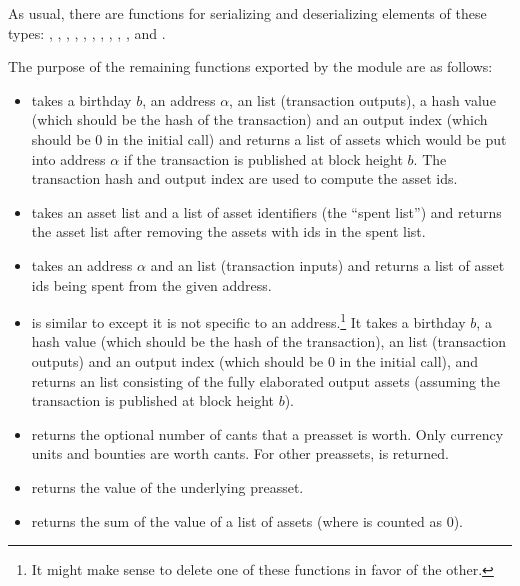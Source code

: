 As usual, there are functions for serializing and deserializing elements of these types:
{},
{},
{},
{},
{},
{},
{},
{},
{},
{},
{}
and
{}.

The purpose of the remaining functions exported by the {} module are as follows:
\begin{itemize}
\item {} takes a birthday $b$, an address $\alpha$,
an {} list (transaction outputs), a hash value (which should
be the hash of the transaction)
and an output index (which should be $0$ in the initial call)
and returns a list of assets which would be put into address $\alpha$
if the transaction is published at block height $b$.
The transaction hash and output index are used to compute the asset ids.
\item {} takes an asset list and a list of asset identifiers (the ``spent list'') and
returns the asset list after removing the assets with ids in the spent list.
\item {} takes an address $\alpha$ and an {} list (transaction inputs)
and returns a list of asset ids being spent from the given address.
\item {} is similar to {} except it is not specific to an address.\footnote{It might make sense to delete one of these functions in favor of the other.}
It takes a birthday $b$, a hash value (which should be the hash of the transaction),
an {} list (transaction outputs)
and an output index (which should be $0$ in the initial call),
and returns an {} list consisting of the fully elaborated output assets
(assuming the transaction is published at block height $b$).
\item {} returns the optional number of cants that a preasset is worth. %
Only currency units and bounties are worth cants. For other preassets, {} is returned.
\item {} returns the value of the underlying preasset.
\item {} returns the sum of the value of a list of assets (where {} is counted as $0$).

\end{itemize}

